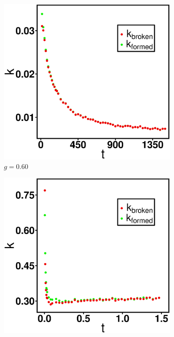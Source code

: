 \documentclass[../../main.tex]{subfiles}
\begin{document}
        \begin{figure}[h]
            \centering
            \begin{subfigure}[b]{0.45\textwidth}
                \centering
                \includegraphics[width=\textwidth]{Figures/rate_g060.eps}
                \caption{$g=0.60$}
                \label{fig: np2D - rate (g=0.60)}
            \end{subfigure}
            \hfill
            \begin{subfigure}[b]{0.45\textwidth}
                \centering
                \includegraphics[width=\textwidth]{Figures/rate_g150.eps}

\end{subfigure}
\end{figure}
\end{document}

